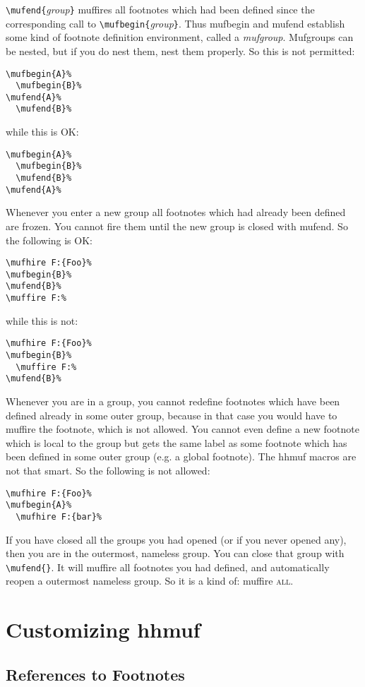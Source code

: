 \documentclass[11pt]{article}
\makeatletter
\def\packagename#1{{\sffamily #1}}     %
\def\macroname#1{{\ttfamily\@ttbs#1}}  %
\def\hhmuf{\packagename{hhmuf}\xspace}
\def\={\verb=}
\def\<#1>{\macroname{#1}}
\def\:{\linebreak[1]}
\makeatother
\begin{document}
\=\mufend=\:\={=\textit{group}\=}= muffires all footnotes which had been
defined since the corresponding call to \=\mufbegin=\:\={=\textit{group}\=}=.
Thus \<mufbegin> and \<mufend> establish some kind of footnote definition
environment, called a \textit{mufgroup}. Mufgroups can be nested, but if
you do nest them, nest them properly. So this is not permitted:
\begin{verbatim}
\mufbegin{A}%
  \mufbegin{B}%
\mufend{A}%
  \mufend{B}%
\end{verbatim}
while this is OK:
\begin{verbatim}
\mufbegin{A}%
  \mufbegin{B}%
  \mufend{B}%
\mufend{A}%
\end{verbatim}
Whenever you enter a new group all footnotes which had already been
defined are frozen. You cannot fire them until the new group is closed
with \<mufend>. So the following is OK:
\begin{verbatim}
\mufhire F:{Foo}%
\mufbegin{B}%
\mufend{B}%
\muffire F:%
\end{verbatim}
while this is not:
\begin{verbatim}
\mufhire F:{Foo}%
\mufbegin{B}%
  \muffire F:%
\mufend{B}%
\end{verbatim}
Whenever you are in a group, you cannot redefine footnotes which have
been defined already in some outer group, because in that case you
would have to muffire the footnote, which is not allowed. You cannot
even define a new footnote which is local to the group but gets the
same label as some footnote which has been defined in some outer group
(e.g. a global footnote). The \hhmuf macros are not that smart. So the
following is not allowed:
\begin{verbatim}
\mufhire F:{Foo}%
\mufbegin{A}%
  \mufhire F:{bar}%
\end{verbatim}
If you have closed all the groups you had opened (or if you never
opened any), then you are in the outermost, nameless group. You can
close that group with \=\mufend{}=. It will muffire all footnotes you
had defined, and automatically reopen a outermost nameless group.
So it is a kind of: \<muffire> \textsc{all}.

\section{Customizing \hhmuf}

\subsection{References to Footnotes}
\end{document}
